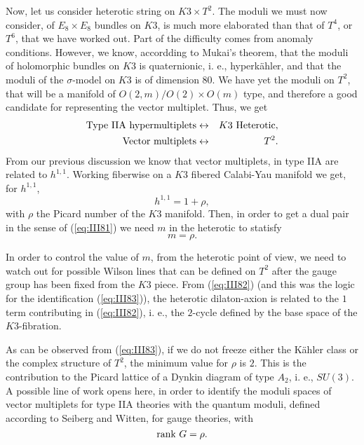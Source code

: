 Now, let us consider heterotic string on $K3 \times T^2$. The
moduli we must now consider, of $E_8 \times E_8$ bundles on $K3$,
is much more elaborated than that of $T^4$, or $T^6$, that we
have worked out. Part of the difficulty comes from anomaly
conditions. However, we know, accordding to Mukai's theorem, that
the moduli of holomorphic bundles on $K3$ is quaternionic, i. e.,
hyperk\"ahler, and that the moduli of the $\sigma$-model on $K3$
is of dimension $80$. We have yet the moduli on $T^2$, that will
be a manifold of $O(2,m)/O(2) \times O(m)$ type, and therefore a good
candidate for representing the vector multiplet. Thus, we get
\begin{eqnarray}
\hbox{Type IIA hypermultiplets} & \leftrightarrow & K3 \hbox {
Heterotic}, \nonumber \\
\hbox {Vector multiplets}       & \leftrightarrow & T^2.
\label{eq:III81}
\end{eqnarray}
From our previous discussion we know that vector multiplets, in
type IIA are related to $h^{1,1}$. Working fiberwise on a
$K3$ fibered Calabi-Yau manifold we get, for $h^{1,1}$,
\begin{equation}
h^{1,1}=1+\rho,
\label{eq:III82}
\end{equation}
with $\rho$ the Picard number of the $K3$ manifold. 
Then, in order to get a dual pair in the sense of
(\ref{eq:III81}) we need $m$ in the heterotic to statisfy
\begin{equation}
m=\rho.
\label{eq:III83}
\end{equation}
  
In order to control the value of $m$, from the heterotic 
point of view, we need to watch out for possible Wilson lines
that can be defined on $T^2$ after the gauge group has been fixed
from the $K3$ piece. From (\ref{eq:III82}) (and this was the
logic for the identification (\ref{eq:III83})), the heterotic
dilaton-axion is related to the $1$ term contributing in
(\ref{eq:III82}), i. e., the $2$-cycle defined by the base space
of the $K3$-fibration. 
  
As can be observed from (\ref{eq:III83}), if we do not freeze
either the K\"ahler class or the complex structure of $T^2$, the
minimum value for $\rho$ is $2$. This is the contribution to the
Picard lattice of a Dynkin diagram of type $A_2$, i. e., $SU(3)$.
A possible line of work opens here, in order to identify the moduli spaces
of vector multiplets for type IIA theories with the quantum
moduli, defined according to Seiberg and Witten, for gauge
theories, with
\begin{equation}
\hbox {rank } G=\rho.
\label{eq:III84}
\end{equation}


